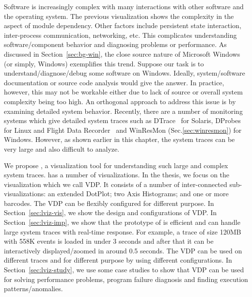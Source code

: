 
Software is increasingly complex with many interactions with other software
and the operating system.
The previous visualization shows the complexity in the
aspect of module dependency.
Other factors include persistent state interaction, inter-process communication,
networking, etc.
This complicates understanding software/component behavior and diagnosing
problems or performance.
As discussed in Section~\ref{sec:bg-win},
the close source nature of Microsoft Windows (or simply, Windows)
exemplifies this trend.
Suppose our task is to understand/diagnose/debug some software on Windows.
Ideally, system/software documentation or source code
analysis would give the answer.
In practice, however, this may not be
workable either due to lack of source or overall
system complexity being too high.
An orthogonal approach to address this issue is by examining
detailed system behavior.
Recently, there are a number of monitoring systems which give detailed system
traces such as DTrace~\cite{cantrill2004dynamic} for Solaris,
DProbes~\cite{moore2001dprobes,bhattacharya2003dynamic} for Linux and Flight
Data Recorder~\cite{verbowski6flight} and WinResMon (Sec.\ref{sec:winresmon})
for Windows.
However, as shown earlier in this chapter,
the system traces can be very large and also
difficult to analyze.

We propose , a visualization tool for
understanding such large and complex system traces.
 has a number of visualizations.
In the thesis, we focus on the visualization which we call VDP.
It consists of a number of inter-connected sub-visualizations:
an extended DotPlot;
two Axis Histograms; and one or more barcodes.
The VDP can be flexibly configured for different purpose.
In Section~\ref{sec:lviz-vis}, we show the design and configurations of VDP.
In Section~\ref{sec:lviz-imp}, we show that
the prototype of  is efficient and can handle large system traces
with real-time response. For example, a trace of size 120MB with 558K events 
is loaded in under 3 seconds
and after that it can be interactively displayed/zoomed in around 0.5 seconds.
The VDP can be used on different traces and for different purpose
by using different configurations.
In Section~\ref{sec:lviz-study}, we use some case studies to show that
VDP can be used for solving performance problems,
program failure diagnosis and finding execution patterns/anomalies.
